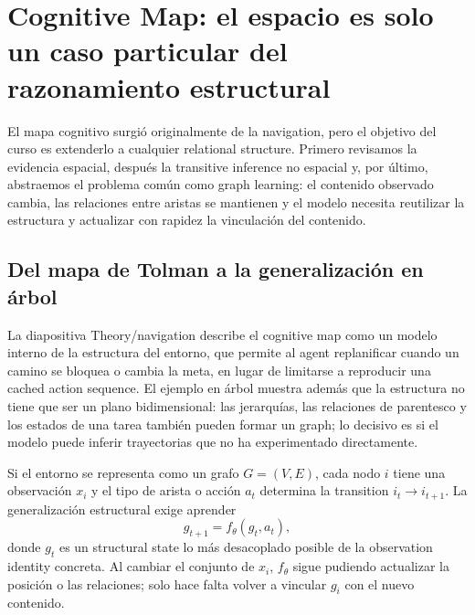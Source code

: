 \section{Cognitive Map: el espacio es solo un caso particular del razonamiento estructural}

El mapa cognitivo surgió originalmente de la navigation, pero el objetivo del curso es extenderlo a cualquier relational structure. Primero revisamos la evidencia espacial, después la transitive inference no espacial y, por último, abstraemos el problema común como graph learning: el contenido observado cambia, las relaciones entre aristas se mantienen y el modelo necesita reutilizar la estructura y actualizar con rapidez la vinculación del contenido.

\subsection{Del mapa de Tolman a la generalización en árbol}

La diapositiva Theory/navigation describe el cognitive map como un modelo interno de la estructura del entorno, que permite al agent replanificar cuando un camino se bloquea o cambia la meta, en lugar de limitarse a reproducir una cached action sequence. El ejemplo en árbol muestra además que la estructura no tiene que ser un plano bidimensional: las jerarquías, las relaciones de parentesco y los estados de una tarea también pueden formar un graph; lo decisivo es si el modelo puede inferir trayectorias que no ha experimentado directamente.



Si el entorno se representa como un grafo $G=(V,E)$, cada nodo $i$ tiene una observación $x_i$ y el tipo de arista o acción $a_t$ determina la transition $i_t\to i_{t+1}$. La generalización estructural exige aprender
$$
g_{t+1}=f_{\theta}(g_t,a_t),
$$
donde $g_t$ es un structural state lo más desacoplado posible de la observation identity concreta. Al cambiar el conjunto de $x_i$, $f_{\theta}$ sigue pudiendo actualizar la posición o las relaciones; solo hace falta volver a vincular $g_i$ con el nuevo contenido.

